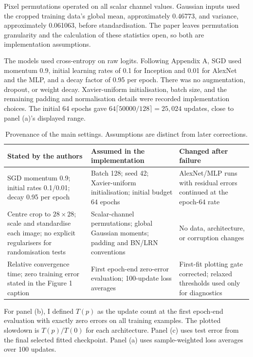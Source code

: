 \documentclass[11pt]{article}
\begin{document}
Pixel permutations operated on all scalar channel values. Gaussian inputs used the cropped training data's global mean, approximately 0.46773, and variance, approximately 0.061063, before standardisation. The paper leaves permutation granularity and the calculation of these statistics open, so both are implementation assumptions.

The models used cross-entropy on raw logits. Following Appendix A, SGD used momentum 0.9, initial learning rates of 0.1 for Inception and 0.01 for AlexNet and the MLP, and a decay factor of 0.95 per epoch. There was no augmentation, dropout, or weight decay. Xavier-uniform initialisation, batch size, and the remaining padding and normalisation details were recorded implementation choices. The initial 64 epochs gave $64\lceil50000/128\rceil=25{,}024$ updates, close to panel (a)'s displayed range.

\begin{table}[htbp]
\centering\small
\begin{tabularx}{\textwidth}{@{}>{\raggedright\arraybackslash}X>{\raggedright\arraybackslash}X>{\raggedright\arraybackslash}X@{}}
\hline
Stated by the authors & Assumed in the implementation & Changed after failure \\
\hline
SGD momentum 0.9; initial rates 0.1/0.01; decay 0.95 per epoch & Batch 128; seed 42; Xavier-uniform initialisation; initial budget 64 epochs & AlexNet/MLP runs with residual errors continued at the epoch-64 rate \\
Centre crop to $28\times28$; scale and standardise each image; no explicit regularisers for randomisation tests & Scalar-channel permutations; global Gaussian moments; padding and BN/LRN conventions & No data, architecture, or corruption changes \\
Relative convergence time; zero training error stated in the Figure 1 caption & First epoch-end zero-error evaluation; 100-update loss averages & First-fit plotting gate corrected; relaxed thresholds used only for diagnostics \\
\hline
\end{tabularx}
\caption{Provenance of the main settings. Assumptions are distinct from later corrections.}
\end{table}

For panel (b), I defined $T(p)$ as the update count at the first epoch-end evaluation with exactly zero errors on all training examples. The plotted slowdown is $T(p)/T(0)$ for each architecture. Panel (c) uses test error from the final selected fitted checkpoint. Panel (a) uses sample-weighted loss averages over 100 updates.
\end{document}
